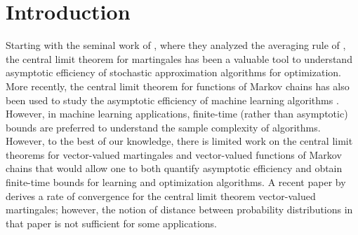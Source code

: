 \documentclass[11pt]{article}
\begin{document}
\section{Introduction}

Starting with the seminal work of \citep{polyak1992acceleration}, where they analyzed the averaging rule of \citep{polyak1990new,ruppert1988efficient}, the central limit theorem for martingales has been a valuable tool to understand asymptotic efficiency of stochastic approximation algorithms for optimization. More recently, the central limit theorem for functions of Markov chains has also been used to study the asymptotic efficiency of machine learning algorithms \citep{borkar2021ode,hu2024central}. However, in machine learning applications, finite-time (rather than asymptotic) bounds are preferred to understand the sample complexity of algorithms. However, to the best of our knowledge, there is limited work on the central limit theorems for vector-valued martingales and vector-valued functions of Markov chains that would allow one to both quantify asymptotic efficiency and obtain finite-time bounds for learning and optimization algorithms. A recent paper by \citep{anastasiou2019normal} derives a rate of convergence for the central limit theorem vector-valued martingales; however, the notion of distance between probability distributions in that paper is not sufficient for some applications.
\end{document}

